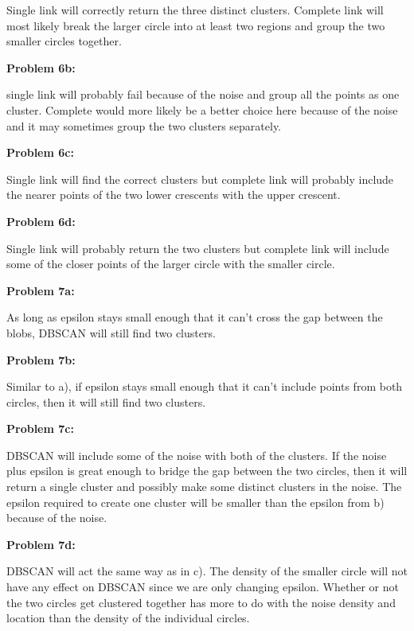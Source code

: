 \documentclass[11pt]{article}
\numberwithin{equation}{section}  %
\begin{document}
\noindent Single link will correctly return the three distinct clusters. Complete link will most likely break the larger circle into at least two regions and group the two smaller circles together.

\vspace*{0.25in}
\noindent\textbf{Problem 6b: }

\noindent single link will probably fail because of the noise and group all the points as one cluster. Complete would more likely be a better choice here because of the noise and it may sometimes group the two clusters separately.

\vspace*{0.25in}
\noindent\textbf{Problem 6c: }

\noindent Single link will find the correct clusters but complete link will probably include the nearer points of the two lower crescents with the upper crescent.

\vspace*{0.25in}
\noindent\textbf{Problem 6d: }

\noindent Single link will probably return the two clusters but complete link will include some of the closer points of the larger circle with the smaller circle.

\vspace*{0.25in}
\noindent\textbf{Problem 7a: }

\noindent As long as epsilon stays small enough that it can't cross the gap between the blobs, DBSCAN will still find two clusters.

\vspace*{0.25in}
\noindent\textbf{Problem 7b: }

\noindent Similar to a), if epsilon stays small enough that it can't include points from both circles, then it will still find two clusters.

\vspace*{0.25in}
\noindent\textbf{Problem 7c: }

\noindent DBSCAN will include some of the noise with both of the clusters. If the noise plus epsilon is great enough to bridge the gap between the two circles, then it will return a single cluster and possibly make some distinct clusters in the noise. The epsilon required to create one cluster will be smaller than the epsilon from b) because of the noise.

\vspace*{0.25in}
\noindent\textbf{Problem 7d: }

\noindent DBSCAN will act the same way as in c). The density of the smaller circle will not have any effect on DBSCAN since we are only changing epsilon. Whether or not the two circles get clustered together has more to do with the noise density and location than the density of the individual circles.

\vspace*{0.25in}
\end{document}
